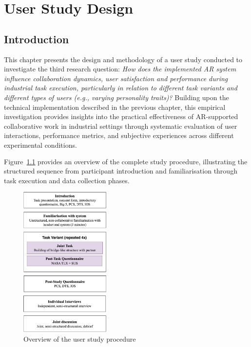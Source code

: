 \chapter{User Study Design}\label{chapter:study-design}

\section{Introduction}\label{sec:study-design-intro}
This chapter presents the design and methodology of a user study conducted to investigate the third research question: \emph{How does the implemented AR system influence collaboration dynamics, user satisfaction and performance during industrial task execution, particularly in relation to different task variants and different types of users (e.g., varying personality traits)?} Building upon the technical implementation described in the previous chapter, this empirical investigation provides insights into the practical effectiveness of AR-supported collaborative work in industrial settings through systematic evaluation of user interactions, performance metrics, and subjective experiences across different experimental conditions.

Figure~\ref{fig:user-study-procedure} provides an overview of the complete study procedure, illustrating the structured sequence from participant introduction and familiarisation through task execution and data collection phases.

\begin{figure}[!htb]
    \centering
    \includegraphics[width=0.4\textwidth]{assets/05/user-study-procedure.pdf}
    \caption{Overview of the user study procedure}
    \label{fig:user-study-procedure}
\end{figure}


